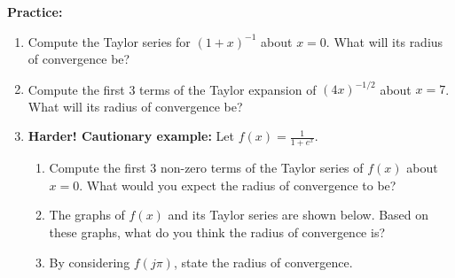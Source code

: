 \documentclass{article}
\begin{document}
\clearpage




\textbf{Practice:}

\vspace{5mm}


\begin{enumerate}
	\item Compute the Taylor series for $(1+x)^{-1}$ about $x=0$. What will its radius of convergence be?
	\item Compute the first 3 terms of the Taylor expansion of $(4x)^{-1/2}$ about $x=7$. What will its radius of convergence be?
	\item \textbf{Harder! Cautionary example:} Let $f(x)=\frac{1}{1+e^x}$.
		\begin{enumerate}
			\item Compute the first 3 non-zero terms of the Taylor series of $f(x)$ about $x=0$. What would you expect the radius of convergence to be?
			\item The graphs of $f(x)$ and its Taylor series are shown below. Based on these graphs, what do you think the radius of convergence is?
			\item By considering $f(j\pi)$, state the radius of convergence.
		\end{enumerate}
\end{enumerate}

\begin{center}
\end{center}
\end{document}
